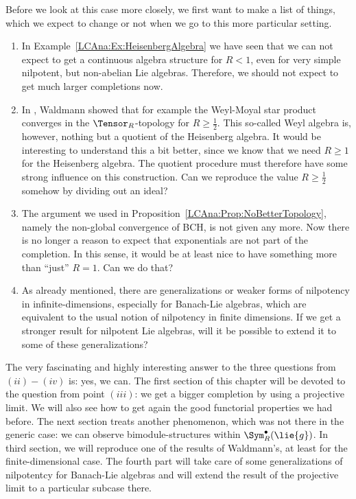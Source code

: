 Before we look at this case more closely, we first want to make a list of things, 
which we expect to change or not when we go to this more particular setting.
\begin{enumerate}
	\item
	In Example~\ref{LCAna:Ex:HeisenbergAlgebra} we have seen that we can not 
	expect to get a continuous algebra structure for $R < 1$, even for very 
	simple nilpotent, but non-abelian Lie algebras. Therefore, we should not 
	expect to get much larger completions now.
	
	\item
	In \cite{waldmann:2014a}, Waldmann showed that for example the Weyl-Moyal 
	star product converges in the $\Tensor_R$-topology for $R \geq \frac{1}{2}$. 
	This so-called 	Weyl algebra is, however, nothing but a quotient of the 
	Heisenberg 	algebra. It would be interesting to understand this a bit better, 
	since we know that we need $R \geq 1$ for the Heisenberg algebra. The quotient 
	procedure must 
	therefore have some strong influence on this construction. Can we 
	reproduce the value $R \geq \frac{1}{2}$ somehow by dividing out an ideal?
	
	\item
	The argument we used in Proposition~\ref{LCAna:Prop:NoBetterTopology},
	namely the non-global convergence of BCH, is not given any more. Now there is 
	no longer a reason to expect that exponentials are not part 
	of the completion. In this sense, it would be at least nice to have 
	something more than ``just'' $R = 1$. Can we do that?
	
	\item
	As already mentioned, there are generalizations or weaker forms of 
	nilpotency in infinite-dimensions, especially for Banach-Lie algebras, 
	which are equivalent to the usual notion of nilpotency in finite 
	dimensions. If we get a stronger result for nilpotent Lie algebras, will it be 
	possible to extend it to some of these generalizations?
\end{enumerate}
The very fascinating and highly interesting answer to the three questions from 
$(ii) - (iv)$ is: yes, we can. The first section of this chapter will be devoted 
to the question from point $(iii)$: we get a bigger completion by using a 
projective limit. We will also see how to get again the good functorial 
properties we had before. The next section treats another phenomenon, which was 
not there in the generic case: we can observe bimodule-structures within 
$\Sym_R^{\bullet}(\lie{g})$. In third section, we will reproduce one of the 
results of Waldmann's, at least for the finite-dimensional case. The fourth part 
will take care of some generalizations of nilpotentcy for Banach-Lie algebras and 
will extend the result of the projective limit to a particular subcase there.



